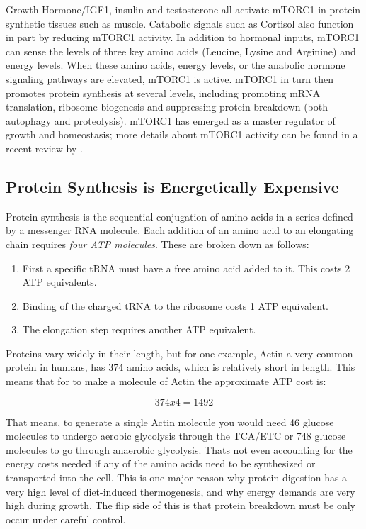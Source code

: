 \documentclass{tufte-handout}
\begin{document}
  Growth Hormone/IGF1, insulin and testosterone all activate mTORC1 in protein synthetic tissues such as muscle.  Catabolic signals such as Cortisol also function in part by reducing mTORC1 activity.  In addition to hormonal inputs, mTORC1 can sense the levels of three key amino acids (Leucine, Lysine and Arginine) and energy levels.  When these amino acids, energy levels, or the anabolic hormone signaling pathways are elevated, mTORC1 is active.  mTORC1 in turn then promotes protein synthesis at several levels, including promoting mRNA translation, ribosome biogenesis and suppressing protein breakdown (both autophagy and proteolysis).  mTORC1 has emerged as a master regulator of growth and homeostasis; more details about mTORC1 activity can be found in a recent review by \citet{Saxton2017}.

\subsection{Protein Synthesis is Energetically Expensive}

Protein synthesis is the sequential conjugation of amino acids in a series defined by a messenger RNA molecule.  Each addition of an amino acid to an elongating chain requires \emph{four ATP molecules}.  These are broken down as follows:

\begin{enumerate}
\item First a specific tRNA must have a free amino acid added to it.  This costs 2 ATP equivalents.
\item Binding of the charged tRNA to the ribosome costs 1 ATP equivalent.
\item The elongation step requires another ATP equivalent.
\end{enumerate}

Proteins vary widely in their length, but for one example, Actin a very common protein in humans, has 374 amino acids, which is relatively short in length.  This means that for to make a molecule of Actin the approximate ATP cost is:

\begin{equation}
374 x 4 = 1492 
\end{equation}

That means, to generate a single Actin molecule you would need 46 glucose molecules to undergo aerobic glycolysis through the TCA/ETC or 748 glucose molecules to go through anaerobic glycolysis. Thats not even accounting for the energy costs needed if any of the  amino acids need to be synthesized or transported into the cell.  This is one major reason why protein digestion has a very high level of diet-induced thermogenesis, and why energy demands are very high during growth.  The flip side of this is that protein breakdown  must be only occur under careful control.
\end{document}
